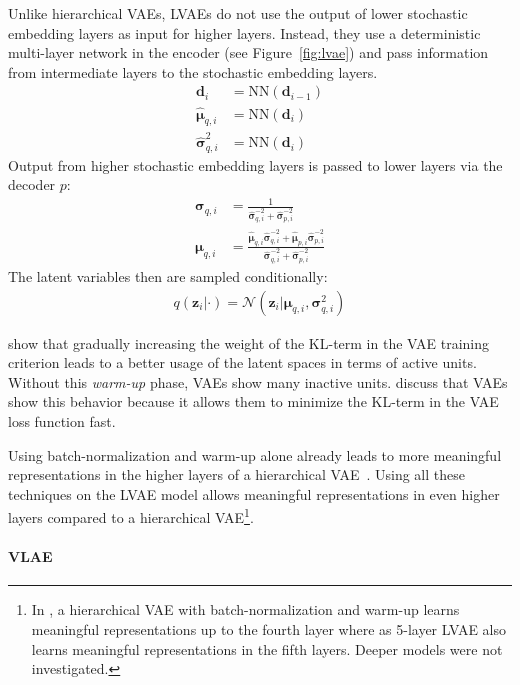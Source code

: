 Unlike hierarchical \acp{VAE}, \acp{LVAE} do not use the output of lower stochastic embedding layers as input for higher layers.
Instead, they use a deterministic multi-layer network in the encoder (see Figure~\ref{fig:lvae}) and pass information from intermediate layers to the stochastic embedding layers.
\begin{align}
    \bm{d}_i &= \text{NN}(\bm{d}_{i-1})\\
    \hat{\bm{\mu}}_{q,i}&=\text{NN}(\bm{d}_i)\\
    \hat{\bm{\sigma}}^2_{q,i}&=\text{NN}(\bm{d}_i)
\end{align}
Output from higher stochastic embedding layers is passed to lower layers via the decoder $p$:
\begin{align}
    \bm{\sigma}_{q,i}&=\frac{1}{\hat{\bm{\sigma}}^{-2}_{q,i}+\hat{\bm{\sigma}}^{-2}_{p,i}}\\
    \bm{\mu}_{q,i}&=\frac{\hat{\bm{\mu}}_{q,i}\hat{\bm{\sigma}}^{-2}_{q,i}+\hat{\bm{\mu}}_{p,i}\hat{\bm{\sigma}}^{-2}_{p,i}}{\hat{\bm{\sigma}}^{-2}_{q,i}+\hat{\bm{\sigma}}^{-2}_{p,i}}
\end{align}
The latent variables then are sampled conditionally:
\begin{align}
    q(\bm{z}_i|\cdot)=\mathcal{N}(\bm{z}_i|\bm{\mu}_{q,i},\bm{\sigma}^2_{q,i})
\end{align}

\citet{sonderby2016ladder} show that gradually increasing the weight of the KL-term in the \ac{VAE} training criterion leads to a better usage of the latent spaces in terms of active units.
Without this \textit{warm-up} phase, \acp{VAE} show many inactive units.
\citet{sonderby2016ladder} discuss that \acp{VAE} show this behavior because it allows them to minimize the KL-term in the \ac{VAE} loss function fast.

Using batch-normalization and warm-up alone already leads to more meaningful representations in the higher layers of a hierarchical VAE~\citep{sonderby2016ladder}.
Using all these techniques on the \ac{LVAE} model allows meaningful representations in even higher layers compared to a hierarchical VAE\footnote{In \citet{sonderby2016ladder}, a hierarchical \ac{VAE} with batch-normalization and warm-up learns meaningful representations up to the fourth layer where as 5-layer \ac{LVAE} also learns meaningful representations in the fifth layers. Deeper models were not investigated.}.

\paragraph{\acl{VLAE}}

